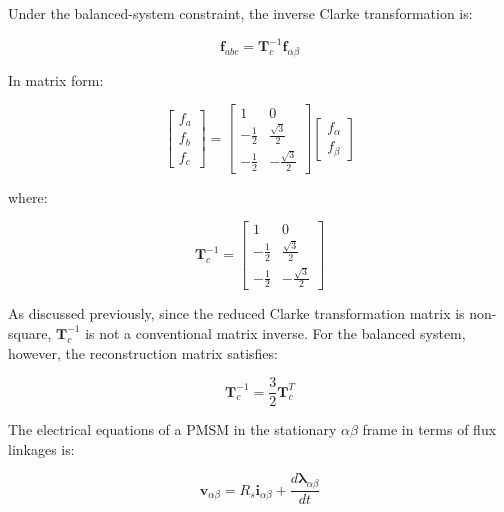 \documentclass{article}
\begin{document}
Under the balanced-system constraint, the inverse Clarke transformation is:

\begin{equation}
    \mathbf{f}_{abc}
    =
    \mathbf{T}_c^{-1}\mathbf{f}_{\alpha\beta}
\end{equation}

In matrix form:

\begin{equation}
    \begin{bmatrix}
        f_a \\
        f_b \\
        f_c
    \end{bmatrix}
    =
    \begin{bmatrix}
        1 & 0 \\
        -\frac{1}{2} & \frac{\sqrt{3}}{2} \\
        -\frac{1}{2} & -\frac{\sqrt{3}}{2}
    \end{bmatrix}
    \begin{bmatrix}
        f_\alpha \\
        f_\beta
    \end{bmatrix}
\end{equation}

where:

\begin{equation}
    \mathbf{T}_c^{-1}
    =
    \begin{bmatrix}
        1 & 0 \\
        -\frac{1}{2} & \frac{\sqrt{3}}{2} \\
        -\frac{1}{2} & -\frac{\sqrt{3}}{2}
    \end{bmatrix}
\end{equation}

As discussed previously, since the reduced Clarke transformation matrix is non-square, $\mathbf{T}_c^{-1}$ is not a conventional matrix inverse. For the balanced system, however, the reconstruction matrix satisfies:

\begin{equation}
    \mathbf{T}_c^{-1}
    =
    \frac{3}{2}\mathbf{T}_c^T
\end{equation}

The electrical equations of a PMSM in the stationary $\alpha\beta$ frame in terms of flux linkages is:

\begin{equation}
    \mathbf{v}_{\alpha\beta}
    =
    R_s\mathbf{i}_{\alpha\beta}
    +
    \frac{d\boldsymbol{\lambda}_{\alpha\beta}}{dt}
\end{equation}
\end{document}
